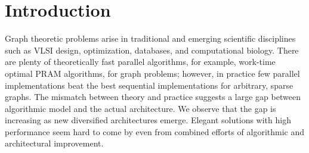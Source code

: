 
\section{Introduction}
\label{s:intr}

 Graph theoretic problems arise in traditional and emerging scientific disciplines such as VLSI design, optimization, databases, and computational biology. There are plenty of theoretically fast parallel algorithms, for example, work-time optimal PRAM algorithms, for graph problems; however, in
 practice few parallel implementations beat the best sequential implementations for arbitrary, sparse
  graphs. The mismatch between theory and practice suggests a large gap between algorithmic model and the actual architecture. We observe that the gap is increasing as new diversified architectures emerge. Elegant solutions with high performance seem hard to come by even from combined efforts of algorithmic and architectural improvement. 

 
